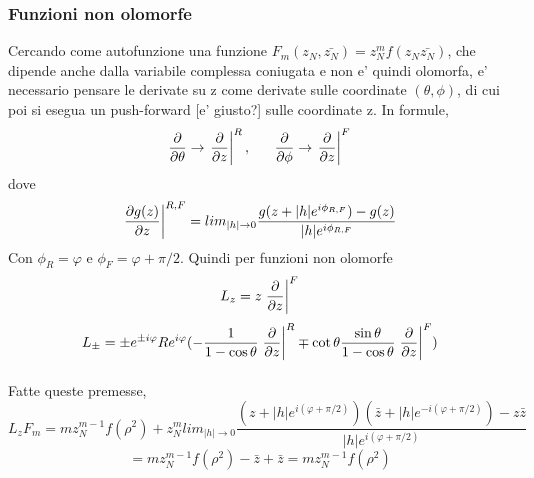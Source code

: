 \subsubsection{Funzioni non olomorfe}
Cercando come autofunzione una funzione \( F_m(z_N,\bar{z_N}) = z_N^m f(z_N\bar{z_N}) \), che dipende anche dalla variabile complessa coniugata e non e' quindi olomorfa, e' necessario pensare le derivate su z come derivate sulle coordinate $(\theta,\phi)$, di cui poi si esegua un push-forward [\todo e' giusto?] sulle coordinate z. In formule,
\[ \frac{\partial }{\partial \theta} \rightarrow \left.\frac{\partial }{\partial z}\right|^R ,\;\;\;\;\;\; \frac{\partial }{\partial \phi} \rightarrow \left.\frac{\partial }{\partial z}\right|^F \]
dove
\[ \left.\frac{\partial g(z)}{\partial z}\right|^{R,F} = lim_{|h|\rightarrow 0} \frac{g(z+|h|e^{i\phi_{R,F}}) - g(z)}{|h|e^{i\phi_{R,F}}} \]
Con \( \phi_R = \varphi \) e \( \phi_F = \varphi+\pi/2 \).
Quindi per funzioni non olomorfe
\[ L_z = z\left.\frac{\partial }{\partial z}\right|^F \]
\[ L_\pm = \pm e^{\pm i\varphi}Re^{i\varphi}  (-\frac{1}{1- \cos\theta}\left.\frac{\partial }{\partial z}\right|^R \mp  \cot\theta \frac{\sin\theta}{1-\cos\theta} \left.\frac{\partial }{\partial z}\right|^F)  \]
\paragraph{}
Fatte queste premesse,
\[ L_z F_m = mz_N^{m-1}f(\rho^2) + z_N^m lim_{|h|\rightarrow 0} \frac{(z+|h|e^{i(\varphi+\pi/2)})(\bar{z}+|h|e^{-i(\varphi+\pi/2)})-z\bar{z}}{|h|e^{i(\varphi+\pi/2)}} \]
\[= mz_N^{m-1}f(\rho^2) -\bar{z}+\bar{z} = mz_N^{m-1}f(\rho^2)\]
